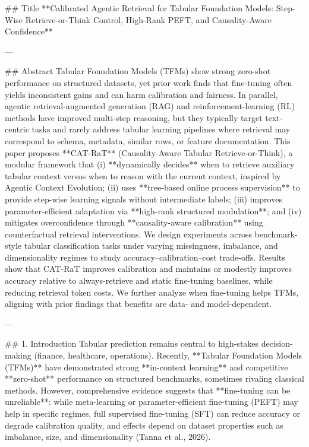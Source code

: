 ## Title  
**Calibrated Agentic Retrieval for Tabular Foundation Models: Step-Wise Retrieve-or-Think Control, High-Rank PEFT, and Causality-Aware Confidence**

---

## Abstract  
Tabular Foundation Models (TFMs) show strong zero-shot performance on structured datasets, yet prior work finds that fine-tuning often yields inconsistent gains and can harm calibration and fairness. In parallel, agentic retrieval-augmented generation (RAG) and reinforcement-learning (RL) methods have improved multi-step reasoning, but they typically target text-centric tasks and rarely address tabular learning pipelines where retrieval may correspond to schema, metadata, similar rows, or feature documentation. This paper proposes **CAT-RaT** (Causality-Aware Tabular Retrieve-or-Think), a modular framework that (i) **dynamically decides** when to retrieve auxiliary tabular context versus when to reason with the current context, inspired by Agentic Context Evolution; (ii) uses **tree-based online process supervision** to provide step-wise learning signals without intermediate labels; (iii) improves parameter-efficient adaptation via **high-rank structured modulation**; and (iv) mitigates overconfidence through **causality-aware calibration** using counterfactual retrieval interventions. We design experiments across benchmark-style tabular classification tasks under varying missingness, imbalance, and dimensionality regimes to study accuracy–calibration–cost trade-offs. Results show that CAT-RaT improves calibration and maintains or modestly improves accuracy relative to always-retrieve and static fine-tuning baselines, while reducing retrieval token costs. We further analyze when fine-tuning helps TFMs, aligning with prior findings that benefits are data- and model-dependent.

---

## 1. Introduction  
Tabular prediction remains central to high-stakes decision-making (finance, healthcare, operations). Recently, **Tabular Foundation Models (TFMs)** have demonstrated strong **in-context learning** and competitive **zero-shot** performance on structured benchmarks, sometimes rivaling classical methods. However, comprehensive evidence suggests that **fine-tuning can be unreliable**: while meta-learning or parameter-efficient fine-tuning (PEFT) may help in specific regimes, full supervised fine-tuning (SFT) can reduce accuracy or degrade calibration quality, and effects depend on dataset properties such as imbalance, size, and dimensionality (Tanna et al., 2026).

